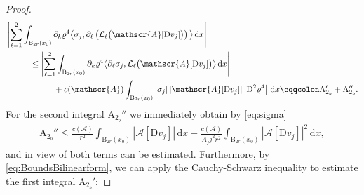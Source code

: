 \documentclass[a4paper,10pt,reqno,oneside]{amsart}
\numberwithin{equation}{section}
\newcommand{\ball}{\mathrm{B}}
\newcommand{\A}{\mathscr{A}}
\newcommand{\D}{\mathrm{D}}
\newcommand{\dx}[1]{\,\mathrm{d}#1}
\newcommand{\skalarProd}[2]{\big\langle#1,#2\big\rangle}
\newcommand{\abs}[1]{\left\lvert#1\right\rvert}
\begin{document}
\begin{proof}
 \begin{align}\label{eq:badpartA2b}
  &\abs{\sum_{\ell=1}^2 \int_{\ball_{2r}(x_0)}\partial_k\varrho^4\skalarProd{\sigma_j}{\partial_\ell\left(\mathcal{L}_{\ell}\big(\A[\D v_j]\big)\right)}\dx{x}} \notag \\
   &\hspace{1cm}\le \abs{\sum_{\ell=1}^2 \int_{\ball_{2r}(x_0)}\partial_k\varrho^4\skalarProd{\partial_{\ell}\sigma_j}{\mathcal{L}_{\ell}\big(\A[\D v_j]\big)}\dx{x}} \\
    &\hspace{2cm} +c(\A) \int_{\ball_{2r}(x_0)} \abs{\sigma_j}\abs{\A[\D v_j]}\abs{\D^2 \varrho^4}\dx{x} \eqqcolon\mathrm{A}_{2_{b}}' + \mathrm{A}_{2_{b}}'' .\notag
 \end{align}
 For the second integral $\mathrm{A}_{2_{b}}''$ we immediately obtain by \eqref{eq:sigma}
 \begin{align}
  \mathrm{A}_{2_{b}}'' \le \frac{c(\A)}{r^2}\int_{\ball_{2r}(x_0)}\abs{\A[\D v_j]}\dx{x} + \frac{c(\A)}{A_jj^2r^2}\int_{\ball_{2r}(x_0)}\abs{\A[\D v_j]}^2\dx{x},
 \end{align}
and in view of  both terms can be estimated. Furthermore, by \eqref{eq:BoundsBilinearform}, we can apply the Cauchy-Schwarz inequality to estimate the first integral $\mathrm{A}_{2_{b}}'$:


\end{proof}
\end{document}

